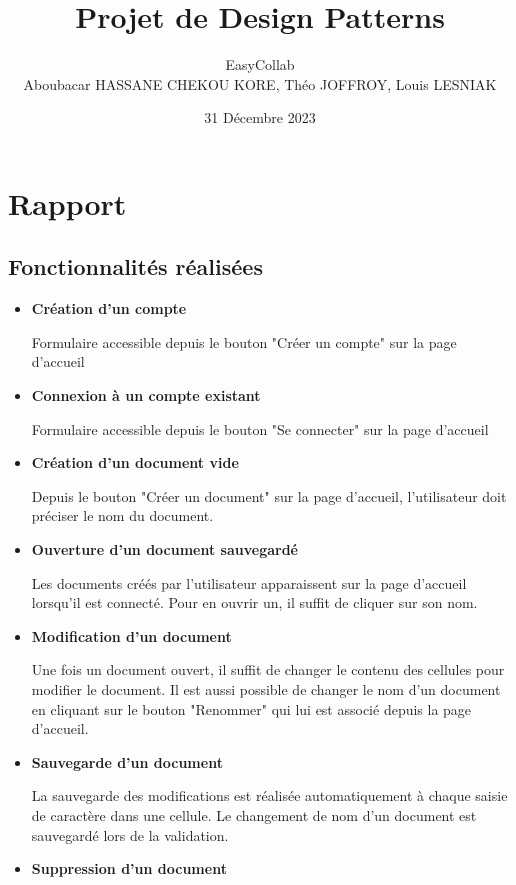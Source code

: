 \documentclass[11pt, letterpaper]{article}
\title{Projet de Design Patterns}
\author{EasyCollab\\Aboubacar HASSANE CHEKOU KORE, Théo JOFFROY, Louis LESNIAK}
\date{31 Décembre 2023}
\begin{document}
\maketitle

\section{Rapport}
\subsection{Fonctionnalités réalisées}

\begin{itemize}
\item \textbf{Création d'un compte}

Formulaire accessible depuis le bouton "Créer un compte" sur la page d'accueil

\item \textbf{Connexion à un compte existant}

Formulaire accessible depuis le bouton "Se connecter" sur la page d'accueil

\item \textbf{Création d'un document vide}

Depuis le bouton "Créer un document" sur la page d'accueil, l'utilisateur doit préciser le nom du document.

\item \textbf{Ouverture d'un document sauvegardé}

Les documents créés par l'utilisateur apparaissent sur la page d'accueil lorsqu'il est connecté. Pour en ouvrir un, il suffit de cliquer sur son nom.

\item \textbf{Modification d'un document}

Une fois un document ouvert, il suffit de changer le contenu des cellules pour modifier le document.
Il est aussi possible de changer le nom d'un document en cliquant sur le bouton "Renommer" qui lui est associé depuis la page d'accueil.


\item \textbf{Sauvegarde d'un document}

La sauvegarde des modifications est réalisée automatiquement à chaque saisie de caractère dans une cellule.
Le changement de nom d'un document est sauvegardé lors de la validation.

\item \textbf{Suppression d'un document}


\end{itemize}
\end{document}
